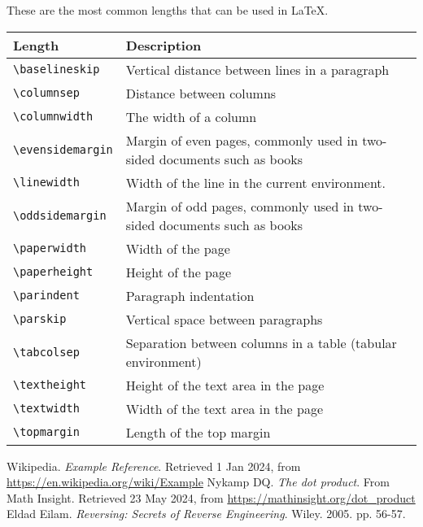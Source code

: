 \documentclass{article}
\begin{document}
\noindent{} %
These are the most common lengths that can be used in \LaTeX.

\bigskip
\begin{tabular}{| p{} | p{} |}
  \hline
  Length & Description \\
  \hline
  \verb|\baselineskip|   & Vertical distance between lines in a paragraph \\
  \verb|\columnsep|      & Distance between columns \\
  \verb|\columnwidth|    & The width of a column \\
  \verb|\evensidemargin| & Margin of even pages, commonly used in two-sided
                           documents such as books \\
  \verb|\linewidth|      & Width of the line in the current environment. \\
  \verb|\oddsidemargin|  & Margin of odd pages, commonly used in two-sided
                           documents such as books \\
  \verb|\paperwidth|     & Width of the page \\
  \verb|\paperheight|    & Height of the page \\
  \verb|\parindent|      & Paragraph indentation \\
  \verb|\parskip|        & Vertical space between paragraphs \\
  \verb|\tabcolsep|      & Separation between columns in a table (tabular
                           environment) \\
  \verb|\textheight|     & Height of the text area in the page \\
  \verb|\textwidth|      & Width of the text area in the page \\
  \verb|\topmargin|      & Length of the top margin \\
  \hline
\end{tabular}
\bigskip


\clearpage
{}
{}

\begin{thebibliography}{9}
  Wikipedia. \emph{Example Reference}. Retrieved 1 Jan 2024, from
  \url{https://en.wikipedia.org/wiki/Example}
  Nykamp DQ. \emph{The dot product}. From Math Insight. Retrieved 23 May 2024,
  from \url{https://mathinsight.org/dot_product}
  Eldad Eilam. \emph{Reversing: Secrets of Reverse Engineering}.
  Wiley. 2005. pp. 56-57.
\end{thebibliography}
\end{document}
